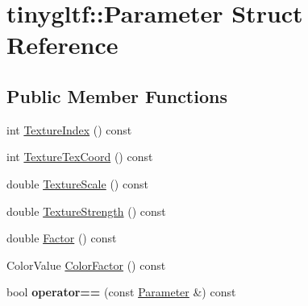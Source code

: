 \hypertarget{structtinygltf_1_1Parameter}{}\section{tinygltf\+:\+:Parameter Struct Reference}
\label{structtinygltf_1_1Parameter}
\subsection*{Public Member Functions}
\begin{DoxyCompactItemize}
\item 
int \hyperlink{structtinygltf_1_1Parameter_a042b94ab31b2a1a76956765cdf560a87}{Texture\+Index} () const
\item 
int \hyperlink{structtinygltf_1_1Parameter_abc90421a12bb284886450d206d1a8a59}{Texture\+Tex\+Coord} () const
\item 
double \hyperlink{structtinygltf_1_1Parameter_a4e50edb053c78f7c947578ad5c562cd5}{Texture\+Scale} () const
\item 
double \hyperlink{structtinygltf_1_1Parameter_a8c3d0b034b3a7912363f8fd13f0f2a5c}{Texture\+Strength} () const
\item 
double \hyperlink{structtinygltf_1_1Parameter_adc4de712403e8e7cfab1340409b103b8}{Factor} () const
\item 
Color\+Value \hyperlink{structtinygltf_1_1Parameter_abb8f9eafdac3746a5858ca89612e2516}{Color\+Factor} () const
\item 
\mbox{\label{structtinygltf_1_1Parameter_a1c4588916ae9a66a7d88a363d7386553}} 
bool {\bfseries operator==} (const \hyperlink{structtinygltf_1_1Parameter}{Parameter} \&) const
\end{DoxyCompactItemize}
